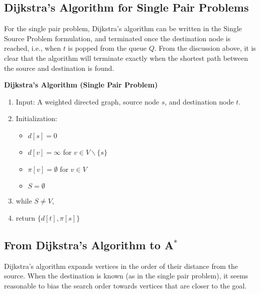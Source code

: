 \subsection{Dijkstra's Algorithm for Single Pair Problems}

For the single pair problem, Dijkstra's algorithm can be written in the Single Source Problem formulation, and terminated once the destination node is reached, i.e., when $t$ is popped from the queue $Q$. From the discussion above, it is clear that the algorithm will terminate exactly when the shortest path between the source and destination is found.

\begin{algorithm_}\textbf{Dijkstra's Algorithm (Single Pair Problem)}
\begin{enumerate}
\item{Input:} A weighted directed graph, source node $s$, and destination node $t$.

\item Initialization:
\begin{itemize}
  \item[] $d[s] = 0$
  \item[] $d[v] = \infty $ for $v \in V\backslash \{ s\} $
  \item[] $\pi [v] = \emptyset $ for $v \in V$
  \item[] $S = \emptyset $
\end{itemize}

\item while $S \ne V$,





\item return $\{ d[t],\pi [s]\} $
\end{enumerate}
\end{algorithm_}

\subsection{From Dijkstra's Algorithm to A$^*$}

Dijkstra's algorithm expands vertices in the order of their distance from the source. When the destination is known (as in the single pair problem), it seems reasonable to bias the search order towards vertices that are closer to the goal. 

